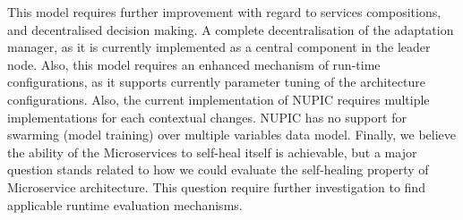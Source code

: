 \documentclass[sigconf]{acmart}
\begin{document}
This model requires further improvement with regard to services compositions, and decentralised decision making. A complete decentralisation of the adaptation manager, as it is currently implemented as a central component in the leader node. Also, this model requires an enhanced mechanism of run-time configurations, as it supports currently parameter tuning of the architecture configurations. Also, the current implementation of NUPIC requires multiple implementations for each contextual changes. NUPIC has no support for swarming (model training) over multiple variables data model. Finally, we believe the ability of the Microservices to self-heal itself is achievable, but a major question stands related to how we could evaluate the self-healing property of Microservice architecture. This question require further investigation to find applicable runtime evaluation mechanisms.      


 
\end{document}

